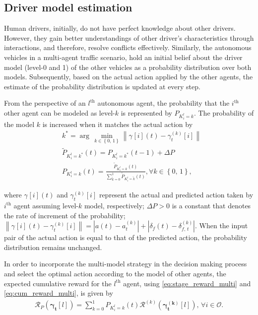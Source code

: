 \documentclass[10pt,journal]{IEEEtran}
\newcommand{\nth}[1]{$#1^{\textrm{th}}$}
\newcommand{\actk}[3]{\gamma^{\left(#2\right)}_{#3}[#1]}
\newcommand{\actt}[3]{\gamma^{}[#1](#3)}
\begin{document}
	\subsection{Driver model estimation}

	Human drivers, initially, do not have perfect knowledge about other drivers. However, they gain better understandings of other driver's characteristics through interactions, and therefore, resolve conflicts effectively. Similarly, the autonomous vehicles in a multi-agent traffic scenario, hold an initial belief about the driver model (level-0 and 1) of the other vehicles as a probability distribution over both models. Subsequently, based on the actual action applied by the other agents, the estimate of the probability distribution is updated at every step.
	
	From the perspective of an \nth{l} autonomous agent, the probability that the \nth{i} other agent can be modeled as level-$k$ is represented by $P_{K_{i}^l = k}$. The probability of the model $k$ is increased when it matches the actual action by 
	\begin{subequations} \label{lv_est}
		\begin{align}
			&k^* = \arg \, \underset{k \in \left\{0,\,1 \right\}} {\min} \left\| \actt{i}{k}{t} - \actk{i}{k}{t}  \right\|  \\ 
			& \tilde{P}_{K_{i}^l = k^*} \left(t\right) = {P}_{K_{i}^l = k^*} \left(t-1\right) + \Delta P  \\ 
			& {P}_{K_{i}^l = k}\left(t\right) = \frac{\tilde{P}_{K_{i}^l = k}\left(t\right) }{\sum_{\tilde{k} = 0}^{1} \tilde{P}_{K_{i}^l = \tilde{k}}\left(t\right) },  \forall k \in \left\{0,\,1 \right\},
		\end{align}
	\end{subequations}
	
	\noindent where $\actt{i}{k}{t}$ and $\actk{i}{k}{t}$ represent the actual and predicted action taken by \nth{i} agent assuming level-$k$ model, respectively; $\Delta P >0 $ is a constant that denotes the rate of increment of the probability;  $\left\|\actt{i}{k}{t} - \actk{i}{k}{t}\right\| = \left| a\left(t\right) - a_t^{(k)} \right| + \left|  \delta_f\left(t\right) - \delta_{f,\,t}^{(k)} \right|$. When the input pair of the actual action is equal to that of the predicted action, the probability distribution remains unchanged.

	In order to incorporate the multi-model strategy in the decision making process and select the optimal action according to the model of other agents, the expected cumulative reward for the \nth{l} agent, using \eqref{eq:stage_reward_multi} and \eqref{eq:cum_reward_multi}, is given by
	\begin{align}
		\mathcal{R}_P\left(\boldsymbol{\gamma_{t}}[l]\right)  = \sum_{k=0}^{1} {P}_{K_{i}^l = k}\left(t\right)  \mathcal{R}^{(k)}\left(\boldsymbol{\gamma_{t}^{(k)}}[l]\right),\, \forall i \in \mathcal{O}.
		\label{eq:cum_reward_prob}
	\end{align}
	 
\end{document}

